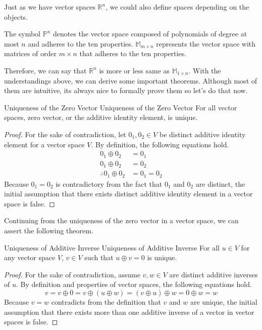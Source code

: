 \documentclass[../main.tex]{subfiles}
\begin{document}
Just as we have vector spaces $\mathbb{R}^n$, we could also define
spaces depending on the objects.

\begin{definition}
The symbol $\mathbb{P}^n$ denotes the vector space composed of
polynomials of degree at most $n$ and adheres to the ten properties.
$\mathbb{M}_{m \times n}$ represents the vector space with matrices
of order $m \times n$ that adheres to the ten properties.
\end{definition}

Therefore, we can say that $\mathbb{R}^n$ is more or less same as
$\mathbb{M}_{1 \times n}$. With the understandings above, we can
derive some important theorems. Although most of them are intuitive,
its always nice to formally prove them so let's do that now.

\begin{theorem}{Uniqueness of the Zero Vector}
{Uniqueness of the Zero Vector}
For all vector spaces, zero vector, or the additive identity element,
is unique.
\end{theorem}
\begin{proof}
For the sake of contradiction, let $0_1, 0_2 \in V$ be distinct
additive identity element for a vector space $V$. By definition,
the following equations hold.
\begin{align*}
    0_1 \oplus 0_2 &= 0_1 \\
    0_1 \oplus 0_2 &= 0_2 \\
    \therefore 0_1 \oplus 0_2 &= 0_1 = 0_2
\end{align*}
Because $0_1 = 0_2$ is contradictory from the fact that $0_1$ and
$0_2$ are distinct, the initial assumption that there exists distinct
additive identity element in a vector space is false.
\end{proof}

Continuing from the uniqueness of the zero vector in a vector space,
we can assert the following theorem.

\begin{theorem}{Uniqueness of Additive Inverse}
{Uniqueness of Additive Inverse}
For all $u \in V$ for any vector space $V$, $v \in V$ such that
$u \oplus v = 0$ is unique.
\end{theorem}
\begin{proof}
For the sake of contradiction, assume $v, w \in V$ are distinct
additive inverses of $u$. By definition and properties of vector
spaces, the following equations hold.
\[
v
= v \oplus 0
= v \oplus (u \oplus w)
= (v \oplus u) \oplus w
= 0 \oplus w
= w
\]
Because $v = w$ contradicts from the definition that $v$ and $w$
are unique, the initial assumption that there exists more than one
additive inverse of a vector in vector spaces is false.
\end{proof}
\end{document}
